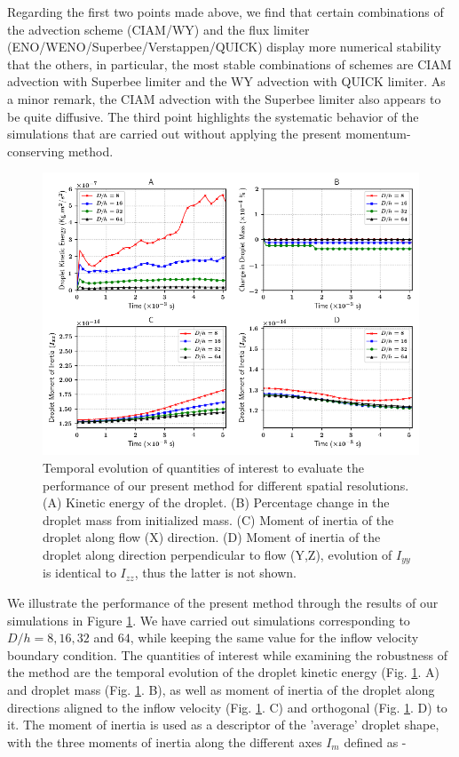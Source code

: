 Regarding the first two points made above, we find that certain combinations of the advection scheme (CIAM/WY) and the flux limiter (ENO/WENO/Superbee/Verstappen/QUICK) display more numerical stability that the others, in particular, the most stable combinations of schemes are CIAM advection with Superbee limiter and the WY advection with QUICK limiter. As a minor remark, the CIAM advection with the Superbee limiter also appears to be quite diffusive. The third point highlights the systematic behavior of the simulations that are carried out without applying the present momentum-conserving method. 

\vspace*{0.2cm}

\begin{figure}[h!]
\begin{center}
\includegraphics[scale = 0.6]{Figures/Sagar/multiplot_raindrop.png}
\end{center}
\vspace*{-0.5cm}
	\caption{Temporal evolution of quantities of interest to evaluate the performance of our present method for different spatial resolutions. (A) Kinetic energy of the droplet. (B) Percentage change in the droplet mass from initialized mass. (C) Moment of inertia of the droplet along flow (X) direction. (D) Moment of inertia of the droplet along direction perpendicular to flow (Y,Z), evolution of $I_{yy}$ is identical to $I_{zz}$, thus the latter is not shown.}
\label{multi}
\end{figure}

We illustrate the performance of the present method through the results of our simulations in Figure \ref{multi}. We have carried out simulations corresponding to $D/h = 8, 16, 32 $ and $64$, while keeping the same value for the inflow velocity boundary condition. The quantities of interest while examining the robustness of the method are the temporal evolution of the droplet kinetic energy (Fig. \ref{multi}. A) and droplet mass (Fig. \ref{multi}. B), as well as moment of inertia of the droplet along directions aligned to the inflow velocity (Fig. \ref{multi}. C) and orthogonal (Fig. \ref{multi}. D) to it. The moment of inertia is used as a descriptor of the 'average' droplet shape, with the three moments of inertia along the different axes $I_m$ defined as - 

